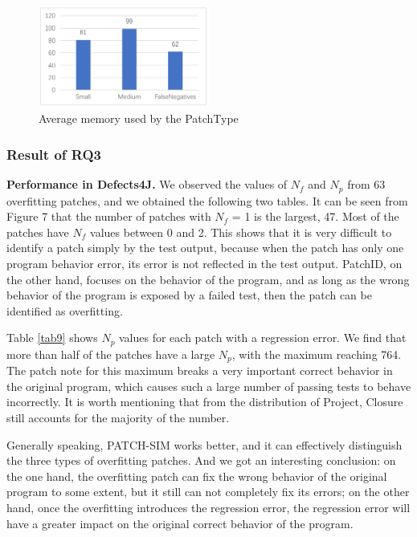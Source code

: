 \documentclass[sn-basic]{sn-jnl}
\theoremstyle{thmstyleone}
\theoremstyle{thmstyletwo}
\theoremstyle{thmstylethree}
\begin{document}
\begin{figure}[h]%
	\centering
	\includegraphics[width=0.5\textwidth]{fig8.png}
	\caption{Average memory used by the PatchType}\label{fig8}
\end{figure}

\subsubsection{Result of RQ3}
\textbf{Performance in Defects4J.} We observed the values of $N_f$ and $N_p$ from 63 overfitting patches, and we obtained the following two tables. It can be seen from Figure 7 that the number of patches with $N_f$ = 1 is the largest, 47. Most of the patches have $N_f$ values between 0 and 2. This shows that it is very difficult to identify a patch simply by the test output, because when the patch has only one program behavior error, its error is not reflected in the test output. PatchID, on the other hand, focuses on the behavior of the program, and as long as the wrong behavior of the program is exposed by a failed test, then the patch can be identified as overfitting.

Table \ref{tab9} shows $N_p$ values for each patch with a regression error. We find that more than half of the patches have a large $N_p$, with the maximum reaching 764. The patch note for this maximum breaks a very important correct behavior in the original program, which causes such a large number of passing tests to behave incorrectly. It is worth mentioning that from the distribution of Project, Closure still accounts for the majority of the number.

Generally speaking, PATCH-SIM works better, and it can effectively distinguish the three types of overfitting patches. And we got an interesting conclusion: on the one hand, the overfitting patch can fix the wrong behavior of the original program to some extent, but it still can not completely fix its errors; on the other hand, once the overfitting introduces the regression error, the regression error will have a greater impact on the original correct behavior of the program.
\end{document}
